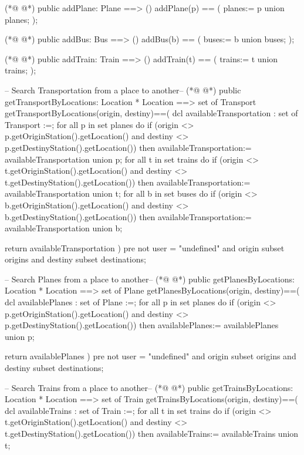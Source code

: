 \begin{vdmpp}[breaklines=true]
(*@
\label{addPlane:86}
@*)
 public addPlane: Plane ==> ()
 addPlane(p) == (
  planes:= {p} union planes;
  );

(*@
\label{addBus:91}
@*)
 public addBus: Bus ==> ()
 addBus(b) == (
  buses:= {b} union buses;
  );

(*@
\label{addTrain:96}
@*)
 public addTrain: Train ==> ()
 addTrain(t) == (
  trains:= {t} union trains;
  );

 -- Search Transportation from a place to another--
(*@
\label{getTransportByLocations:102}
@*)
 public getTransportByLocations: Location * Location ==> set of Transport
 getTransportByLocations(origin, destiny)==(
 dcl availableTransportation : set of Transport :={};
 for all p in set planes do
  if (origin <> p.getOriginStation().getLocation() and destiny <> p.getDestinyStation().getLocation())
  then availableTransportation:= availableTransportation union {p};
 for all t in set trains do
  if (origin <> t.getOriginStation().getLocation() and destiny <> t.getDestinyStation().getLocation())
  then availableTransportation:= availableTransportation union {t};
 for all b in set buses do
  if (origin <> b.getOriginStation().getLocation() and destiny <> b.getDestinyStation().getLocation())
  then availableTransportation:= availableTransportation union {b};


 return availableTransportation
 )
  pre not user = "undefined"
  and {origin} subset origins
  and {destiny} subset destinations;

  -- Search Planes from a place to another--
(*@
\label{getPlanesByLocations:123}
@*)
 public getPlanesByLocations: Location * Location ==> set of Plane
 getPlanesByLocations(origin, destiny)==(
 dcl availablePlanes : set of Plane :={};
 for all p in set planes do
  if (origin <> p.getOriginStation().getLocation() and destiny <> p.getDestinyStation().getLocation())
  then availablePlanes:= availablePlanes union {p};

 return availablePlanes
 )
  pre not user = "undefined"
  and {origin} subset origins
  and {destiny} subset destinations;

   -- Search Trains from a place to another--
(*@
\label{getTrainsByLocations:137}
@*)
 public getTrainsByLocations: Location * Location ==> set of Train
 getTrainsByLocations(origin, destiny)==(
 dcl availableTrains : set of Train :={};
 for all t in set trains do
  if (origin <> t.getOriginStation().getLocation() and destiny <> t.getDestinyStation().getLocation())
  then availableTrains:= availableTrains union {t};


\end{vdmpp}

